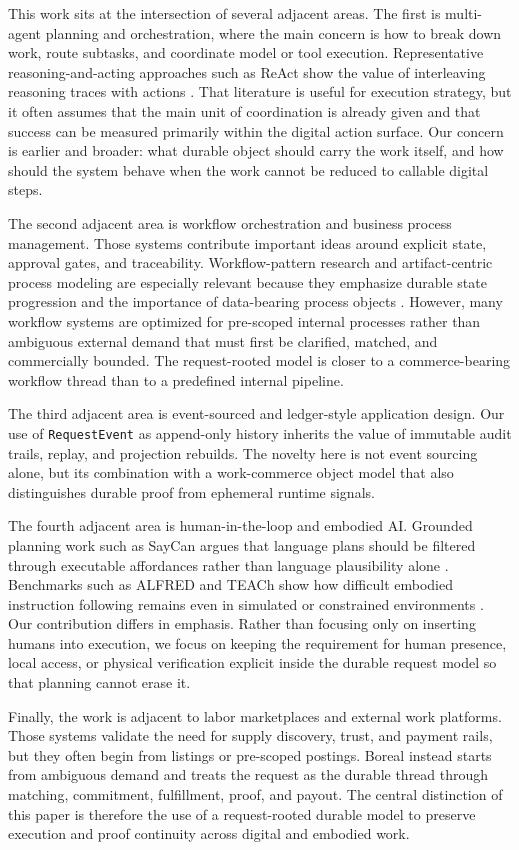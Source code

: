 This work sits at the intersection of several adjacent areas. The first is multi-agent planning and orchestration, where the main concern is how to break down work, route subtasks, and coordinate model or tool execution. Representative reasoning-and-acting approaches such as ReAct show the value of interleaving reasoning traces with actions \cite{yao2023react}. That literature is useful for execution strategy, but it often assumes that the main unit of coordination is already given and that success can be measured primarily within the digital action surface. Our concern is earlier and broader: what durable object should carry the work itself, and how should the system behave when the work cannot be reduced to callable digital steps.

The second adjacent area is workflow orchestration and business process management. Those systems contribute important ideas around explicit state, approval gates, and traceability. Workflow-pattern research and artifact-centric process modeling are especially relevant because they emphasize durable state progression and the importance of data-bearing process objects \cite{vanderaalst2003workflow,cohn2009business}. However, many workflow systems are optimized for pre-scoped internal processes rather than ambiguous external demand that must first be clarified, matched, and commercially bounded. The request-rooted model is closer to a commerce-bearing workflow thread than to a predefined internal pipeline.

The third adjacent area is event-sourced and ledger-style application design. Our use of \texttt{RequestEvent} as append-only history inherits the value of immutable audit trails, replay, and projection rebuilds. The novelty here is not event sourcing alone, but its combination with a work-commerce object model that also distinguishes durable proof from ephemeral runtime signals.

The fourth adjacent area is human-in-the-loop and embodied AI. Grounded planning work such as SayCan argues that language plans should be filtered through executable affordances rather than language plausibility alone \cite{ahn2022saycan}. Benchmarks such as ALFRED and TEACh show how difficult embodied instruction following remains even in simulated or constrained environments \cite{shridhar2020alfred,padmakumar2021teach}. Our contribution differs in emphasis. Rather than focusing only on inserting humans into execution, we focus on keeping the requirement for human presence, local access, or physical verification explicit inside the durable request model so that planning cannot erase it.

Finally, the work is adjacent to labor marketplaces and external work platforms. Those systems validate the need for supply discovery, trust, and payment rails, but they often begin from listings or pre-scoped postings. Boreal instead starts from ambiguous demand and treats the request as the durable thread through matching, commitment, fulfillment, proof, and payout. The central distinction of this paper is therefore the use of a request-rooted durable model to preserve execution and proof continuity across digital and embodied work.
